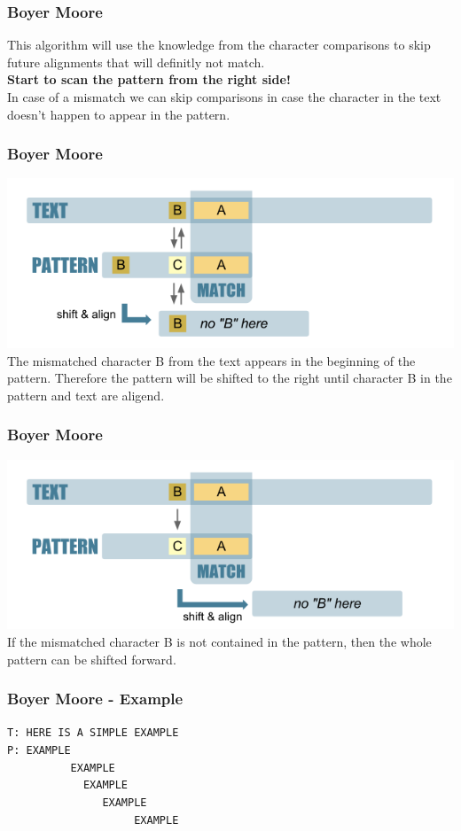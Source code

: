 \begin{frame}[fragile] 
  \frametitle{Boyer Moore}
  This algorithm will use the knowledge from the character comparisons to skip
  future alignments that will definitly not match.\\
  {\bf Start to scan the pattern from the right side!}\\
  In case of a mismatch we can skip comparisons in case the character in the text
  doesn’t happen to appear in the pattern.
\end{frame}

\begin{frame}[fragile]
  \frametitle{Boyer Moore}
  \includegraphics[scale=0.4]{img/bm1.png}\\
  \vspace{1mm}
  The mismatched character B from the text appears in the beginning of the pattern.
  Therefore the pattern will be shifted to the right until character B in the
  pattern and text are aligend.
\end{frame}

\begin{frame}[fragile]
  \frametitle{Boyer Moore}
  \includegraphics[scale=0.4]{img/bm2.png}\\
  \vspace{1mm}
  If the mismatched character B is not contained in the pattern, then the whole
  pattern can be shifted forward.
\end{frame}

\begin{frame}[fragile] 
\frametitle{Boyer Moore - Example}
\verb|T: HERE IS A SIMPLE EXAMPLE|\\
\verb|P: EXAMPLE|\\
\verb|          EXAMPLE|\\
\verb|            EXAMPLE|\\
\verb|               EXAMPLE|\\
\verb|                    EXAMPLE|
\end{frame}

